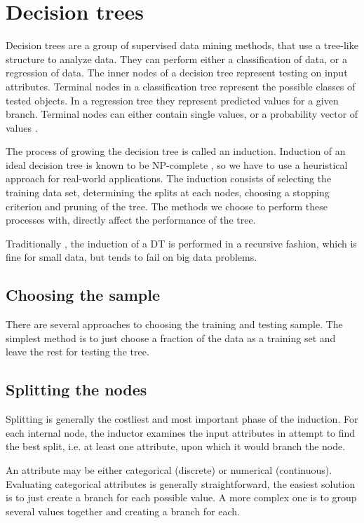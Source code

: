 \documentclass[thesis=B,english]{FITthesis}[2012/10/20]
\begin{document}
\chapter{Decision trees}
\label{chap:DT}
		Decision trees are a group of supervised data mining methods, that use a tree-like structure to analyze data. They can perform either a classification of data, or a regression of data. The inner nodes of a decision tree represent testing on input attributes. \cite{CMP07} Terminal nodes in a classification tree represent the possible classes of tested objects. In a regression tree they represent predicted values for a given branch. Terminal nodes can either contain single values, or a probability vector of values \cite{TOP_DOWN_INDUCTION_SURVEY}. 

		The process of growing the decision tree is called an induction. Induction of an ideal decision tree is known to be NP-complete \cite{NP-COMPLETE}, so we have to use a heuristical approach for real-world applications. The induction consists of selecting the training data set, determining the splits at each nodes, choosing a stopping criterion and pruning of the tree. The methods we choose to perform these processes with, directly affect the performance of the tree. 

		Traditionally \cite{CART}, the induction of a DT is performed in a recursive fashion, which is fine for small data, but tends to fail on big data problems.

		\section{Choosing the sample}
			There are several approaches to choosing the training and testing sample. The simplest method is to just choose a fraction of the data as a training set and leave the rest for testing the tree. 
		
		\section{Splitting the nodes}
			Splitting is generally the costliest and most important phase of the induction. For each internal node, the inductor examines the input attributes in attempt to find the best split, i.e. at least one attribute, upon which it would branch the node. 

			An attribute may be either categorical (discrete) or numerical (continuous). Evaluating categorical attributes is generally straightforward, the easiest solution is to just create a branch for each possible value. A more complex one is to group several values together and creating a branch for each. 
\end{document}
